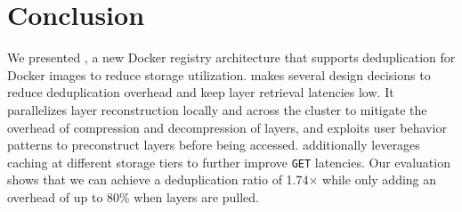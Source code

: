 \section{Conclusion}
\label{sec:conclusion}

We presented \sysname, a new Docker registry architecture that supports deduplication for
Docker images to reduce storage utilization. \sysname makes several design decisions to
reduce deduplication overhead and keep layer retrieval latencies low. It parallelizes
layer reconstruction locally and across the cluster to mitigate the overhead of
compression and decompression of layers, and exploits user behavior patterns to preconstruct
layers before being accessed. \sysname additionally leverages caching at different
storage tiers to further improve \texttt{GET} latencies. Our evaluation shows that
we can achieve a deduplication ratio of 1.74$\times$ while only adding an overhead
of up to 80\% when layers are pulled.
